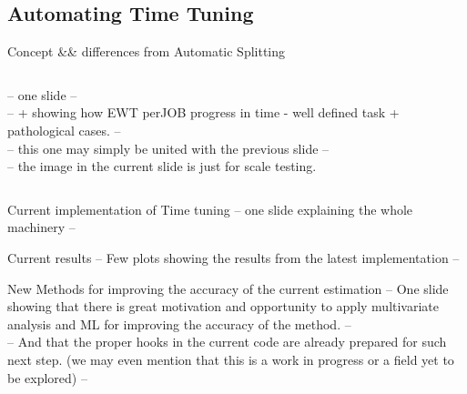 \documentclass[8pt,mathserif,a4paper,oneside,pdf]{beamer}
\begin{document}
\subsection[Automating Time Tuning]{Automating Time Tuning}
\begin{frame}[fragile]{Concept \&\& differences from Automatic Splitting}
  \begin{columns}

    \begin{column}[T]{4cm}
      -- one slide --\\
      -- + showing how EWT perJOB progress in time - well defined task + pathological cases. --\\
      -- this one may simply be united with the previous slide -- \\
      -- the image in the current slide is just for scale testing.
    \end{column}

    \begin{column}[T]{6cm}
      {}
    \end{column}

  \end{columns}

\end{frame}


\begin{frame}[fragile]{Current implementation of Time tuning}
  -- one slide explaining the whole machinery --  \\
\end{frame}


\begin{frame}[fragile]{Current results}
  -- Few plots showing the results from the latest implementation --\\
\end{frame}

\begin{frame}[fragile]{New Methods for improving the accuracy of the current estimation}
  -- One slide showing that there is great motivation and opportunity to apply multivariate analysis and ML for improving the accuracy of the method. --\\
  -- And that the proper hooks in the current code are already prepared for such next step. (we may even mention that this is a work in progress or a field yet to be explored) --\\
\end{frame}
\end{document}
